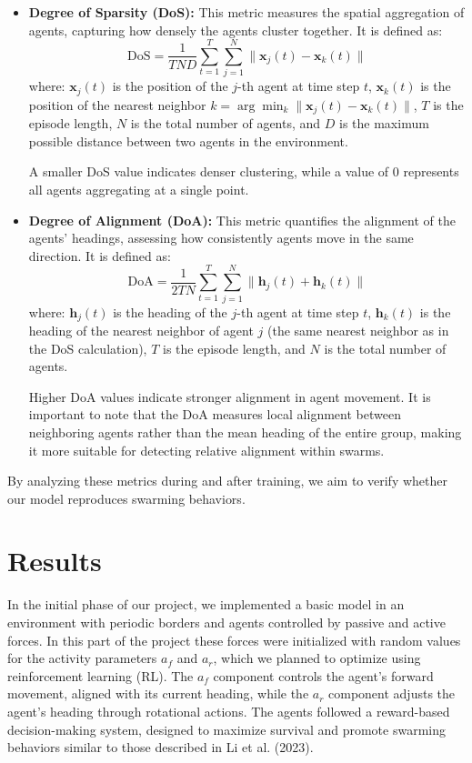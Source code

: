 \documentclass[9pt]{pnas-new}
\begin{document}
\begin{itemize}
    \item \textbf{Degree of Sparsity (DoS):} This metric measures the spatial aggregation of agents, capturing how densely the agents cluster together. It is defined as:
    \[
    \text{DoS} = \frac{1}{TND} \sum_{t=1}^T \sum_{j=1}^N \| \mathbf{x}_j(t) - \mathbf{x}_k(t) \|
    \]
    where: \( \mathbf{x}_j(t) \) is the position of the \(j\)-th agent at time step \(t\), \( \mathbf{x}_k(t) \) is the position of the nearest neighbor \(k = \arg\min_k \| \mathbf{x}_j(t) - \mathbf{x}_k(t) \| \), \(T\) is the episode length, \(N\) is the total number of agents, and \(D\) is the maximum possible distance between two agents in the environment.
    
    A smaller DoS value indicates denser clustering, while a value of 0 represents all agents aggregating at a single point.

    \item \textbf{Degree of Alignment (DoA):} This metric quantifies the alignment of the agents' headings, assessing how consistently agents move in the same direction. It is defined as:
    \[
    \text{DoA} = \frac{1}{2TN} \sum_{t=1}^T \sum_{j=1}^N \| \mathbf{h}_j(t) + \mathbf{h}_k(t) \|
    \]
    where: \( \mathbf{h}_j(t) \) is the heading of the \(j\)-th agent at time step \(t\), \( \mathbf{h}_k(t) \) is the heading of the nearest neighbor of agent \(j\) (the same nearest neighbor as in the DoS calculation), \(T\) is the episode length, and \(N\) is the total number of agents.
    
    Higher DoA values indicate stronger alignment in agent movement. It is important to note that the DoA measures local alignment between neighboring agents rather than the mean heading of the entire group, making it more suitable for detecting relative alignment within swarms.
\end{itemize}

By analyzing these metrics during and after training, we aim to verify whether our model reproduces swarming behaviors.


\section*{Results}

In the initial phase of our project, we implemented a basic model in an environment with periodic borders and agents controlled by passive and active forces. 
In this part of the project these forces were initialized with random values for the activity parameters $a_f$ and $a_r$, which we planned to optimize using reinforcement learning (RL). 
The $a_f$ component controls the agent's forward movement, aligned with its current heading, while the $a_r$ component adjusts the agent's heading through rotational actions.
The agents followed a reward-based decision-making system, designed to maximize survival and promote swarming behaviors similar to those described in Li et al. (2023).
\end{document}
